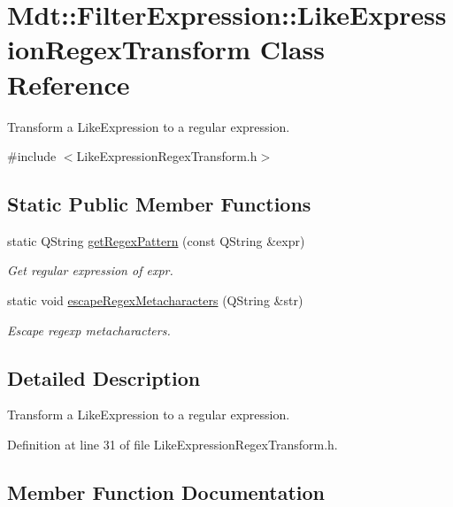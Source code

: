 \hypertarget{class_mdt_1_1_filter_expression_1_1_like_expression_regex_transform}{}\section{Mdt\+:\+:Filter\+Expression\+:\+:Like\+Expression\+Regex\+Transform Class Reference}
\label{class_mdt_1_1_filter_expression_1_1_like_expression_regex_transform}


Transform a Like\+Expression to a regular expression.  




{\ttfamily \#include $<$Like\+Expression\+Regex\+Transform.\+h$>$}

\subsection*{Static Public Member Functions}
\begin{DoxyCompactItemize}
\item 
static Q\+String \hyperlink{class_mdt_1_1_filter_expression_1_1_like_expression_regex_transform_a64ad9e380e0c12abc8f6bcdfaf642255}{get\+Regex\+Pattern} (const Q\+String \&expr)
\begin{DoxyCompactList}\small\item\em Get regular expression of expr. \end{DoxyCompactList}\item 
static void \hyperlink{class_mdt_1_1_filter_expression_1_1_like_expression_regex_transform_a0beac0e2295cfa541e2511e814c54b8f}{escape\+Regex\+Metacharacters} (Q\+String \&str)
\begin{DoxyCompactList}\small\item\em Escape regexp metacharacters. \end{DoxyCompactList}\end{DoxyCompactItemize}


\subsection{Detailed Description}
Transform a Like\+Expression to a regular expression. 

Definition at line 31 of file Like\+Expression\+Regex\+Transform.\+h.



\subsection{Member Function Documentation}
